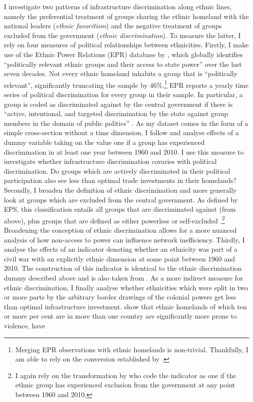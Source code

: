 \documentclass[11pt, oneside]{article}   	%
\begin{document}
I investigate two patterns of infrastructure discrimination along ethnic lines, namely the preferential treatment of  groups sharing the ethnic homeland with the national leaders (\emph{ethnic favoritism}) and the negative treatment of groups excluded from the government (\emph{ethnic discrimination}). To measure the latter, I rely on four measures of political relationships between ethnicities. Firstly, I make use of the Ethnic Power Relations (EPR) database by \cite{Vogt_IntegratingDataEthnicity_2015}, which globally identifies ``politically relevant ethnic groups and their access to state power'' \citep[p.1328]{Vogt_IntegratingDataEthnicity_2015} over the last seven decades. Not every ethnic homeland inhabits a group that is ``politically relevant'', significantly truncating the sample by 46\%.\footnote{Merging EPR observations with ethnic homelands is non-trivial. Thankfully, I am able to rely on the conversion established by \cite{michalopoulos_long-run_2016}.} EPR reports a yearly time series of political discrimination for every group in their sample. In particular, a group is coded as discriminated against by the central government if there is ``active, intentional, and targeted discrimination by the state against group members in the domain of public politics'' \citep[p.1331]{Vogt_IntegratingDataEthnicity_2015}. As my dataset comes in the form of a simple cross-section without a time dimension, I follow \cite{michalopoulos_long-run_2016} and analyse effects of a dummy variable taking on the value one if a group has experienced discrimination in at least one year between 1960 and 2010. I use this measure to investigate whether infrastructure discrimination covaries with political discrimination. Do groups which are actively discriminated in their political participation also see less than optimal trade investments in their homelands? Secondly, I broaden the definition of ethnic discrimination and more generally look at groups which are excluded from the central government. As defined by EPS, this classification entails all groups that are discriminated against (from above), plus groups that are defined as either powerless or self-excluded \citep[p.1331]{Vogt_IntegratingDataEthnicity_2015}.\footnote{I again rely on the transformation by \cite{michalopoulos_long-run_2016} who code the indicator as one if the ethnic group has experienced exclusion from the government at any point between 1960 and 2010.} Broadening the conception of ethnic discrimination allows for a more nuanced analysis of how non-access to power can influence network inefficiency. Thirdly, I analyse the effects of an indicator denoting whether an ethnicity was part of a civil war with an explicitly ethnic dimension at some point between 1960 and 2010. The construction of this indicator is identical to the ethnic discrimination dummy described above and is also taken from \cite{michalopoulos_long-run_2016}. As a more indirect measure for ethnic discrimination, I finally analyse whether ethnicities which were split in two or more parts by the arbitrary border drawings of the colonial powers get less than optimal infrastructure investment. \cite{michalopoulos_long-run_2016} show that ethnic homelands of which ten or more per cent are in more than one country are significantly more prone to violence, have 
\end{document}
